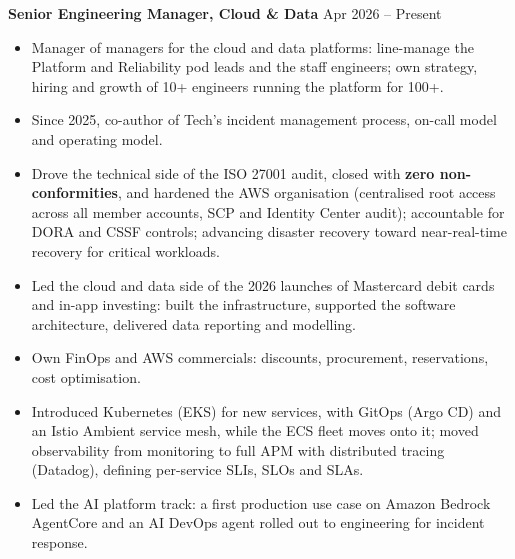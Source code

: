 \documentclass[10pt,a4paper]{article}
\newcommand{\role}[2]{%
  \needspace{6\baselineskip}%
  \vspace{2pt}\textbf{#1} \hfill \textcolor{muted}{#2}\par
}
\begin{document}
\role{Senior Engineering Manager, Cloud \& Data}{Apr 2026 -- Present}
\begin{itemize}
  \item Manager of managers for the cloud and data platforms: line-manage the Platform and Reliability pod leads and the staff engineers; own strategy, hiring and growth of 10+ engineers running the platform for 100+.
  \item Since 2025, co-author of Tech's incident management process, on-call model and operating model.
  \item Drove the technical side of the ISO 27001 audit, closed with \textbf{zero non-conformities}, and hardened the AWS organisation (centralised root access across all member accounts, SCP and Identity Center audit); accountable for DORA and CSSF controls; advancing disaster recovery toward near-real-time recovery for critical workloads.
  \item Led the cloud and data side of the 2026 launches of Mastercard debit cards and in-app investing: built the infrastructure, supported the software architecture, delivered data reporting and modelling.
  \item Own FinOps and AWS commercials: discounts, procurement, reservations, cost optimisation.
  \item Introduced Kubernetes (EKS) for new services, with GitOps (Argo CD) and an Istio Ambient service mesh, while the ECS fleet moves onto it; moved observability from monitoring to full APM with distributed tracing (Datadog), defining per-service SLIs, SLOs and SLAs.
  \item Led the AI platform track: a first production use case on Amazon Bedrock AgentCore and an AI DevOps agent rolled out to engineering for incident response.
\end{itemize}
\end{document}

